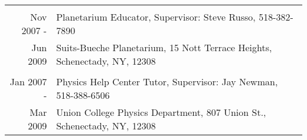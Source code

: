 \documentclass[letterpaper,11pt]{article} %
\begin{document}
\begin{tabulary}{\textwidth}{RL}
\vspace{5pt} \\

Nov 2007 -     & Planetarium Educator, Supervisor: Steve Russo, 518-382-7890 \\
 Jun 2009      & Suits-Bueche Planetarium, 15 Nott Terrace Heights, Schenectady, NY, 12308 \\ %

\vspace{5pt} \\

Jan 2007 -     & Physics Help Center Tutor, Supervisor: Jay Newman, 518-388-6506 \\
 Mar 2009      & Union College Physics Department, 807 Union St., Schenectady, NY, 12308 \\

\end{tabulary}

\endgroup
\end{document}
